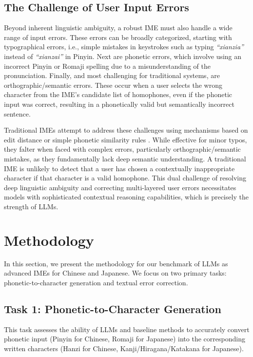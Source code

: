 \documentclass[10pt, a4paper]{article}
\begin{document}
\subsection{The Challenge of User Input Errors}
Beyond inherent linguistic ambiguity, a robust IME must also handle a wide range of input errors. These errors can be broadly categorized, starting with {typographical errors}, i.e., simple mistakes in keystrokes such as typing \textit{``xianzia''} instead of \textit{``xianzai''} in Pinyin. Next are {phonetic errors}, which involve using an incorrect Pinyin or Romaji spelling due to a misunderstanding of the pronunciation. Finally, and most challenging for traditional systems, are {orthographic/semantic errors}. These occur when a user selects the wrong character from the IME's candidate list of homophones, even if the phonetic input was correct, resulting in a phonetically valid but semantically incorrect sentence.

Traditional IMEs attempt to address these challenges using mechanisms based on edit distance or simple phonetic similarity rules \citep{wagner1974string, jurafsky2000speech, gao2002improving}. While effective for minor typos, they falter when faced with complex errors, particularly orthographic/semantic mistakes, as they fundamentally lack deep semantic understanding. A traditional IME is unlikely to detect that a user has chosen a contextually inappropriate character if that character is a valid homophone. This dual challenge of resolving deep linguistic ambiguity and correcting multi-layered user errors necessitates models with sophisticated contextual reasoning capabilities, which is precisely the strength of LLMs.

\section{Methodology}
\label{sec:methodology}

In this section, we present the methodology for our benchmark of LLMs as advanced IMEs for Chinese and Japanese. We focus on two primary tasks: phonetic-to-character generation and textual error correction. 

\subsection{Task 1: Phonetic-to-Character Generation}

This task assesses the ability of LLMs and baseline methods to accurately convert phonetic input (Pinyin for Chinese, Romaji for Japanese) into the corresponding written characters (Hanzi for Chinese, Kanji/Hiragana/Katakana for Japanese).
\end{document}
